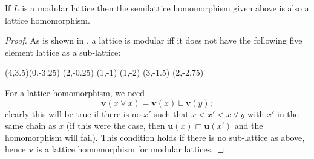 \documentclass{report}
\begin{document}
\begin{prop}
If $L$ is a modular lattice then the semilattice homomorphism given above is also a lattice homomorphism.
\end{prop}
\begin{proof}

As is shown in \citep{Birkhoff:48}, a lattice is modular iff it does not have the following five element lattice as a sub-lattice:
\begin{center}
%
\begin{graph}(4,3.5)(0,-3.25)
(2,-0.25)
(1,-1)
(1,-2)
(3,-1.5)
(2,-2.75)
  
 
\end{graph}
\end{center}
For a lattice homomorphism, we need
$$\mathbf{v}(x\lor x) = \mathbf{v}(x)\sqcup\mathbf{v}(y);$$
clearly this will be true if there is no $x'$ such that $x < x' < x\lor y$ with $x'$ in the same chain as $x$ (if this were the case, then $\mathbf{u}(x) \sqsubset\mathbf{u}(x')$ and the homomorphism will fail). This condition holds if there is no sub-lattice as above, hence $\mathbf{v}$ is a lattice homomorphism for modular lattices.
\end{proof}



\end{document}
